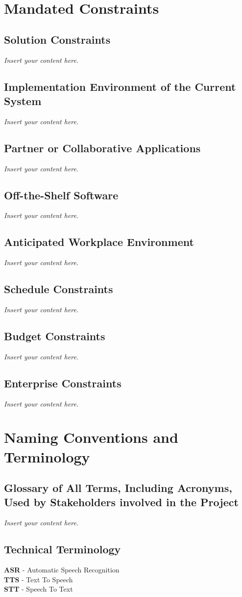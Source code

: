 \documentclass[12pt]{article}
\newcommand{\lips}{\textit{Insert your content here.}}
\begin{document}
\section{Mandated Constraints}
\subsection{Solution Constraints}
\lips
\subsection{Implementation Environment of the Current System}
\lips
\subsection{Partner or Collaborative Applications}
\lips
\subsection{Off-the-Shelf Software}
\lips
\subsection{Anticipated Workplace Environment}
\lips
\subsection{Schedule Constraints}
\lips
\subsection{Budget Constraints}
\lips
\subsection{Enterprise Constraints}
\lips

\section{Naming Conventions and Terminology}
\subsection{Glossary of All Terms, Including Acronyms, Used by Stakeholders
involved in the Project}
\lips

\subsection{Technical Terminology}
\textbf{ASR} - Automatic Speech Recognition \\
\textbf{TTS} - Text To Speech \\
\textbf{STT} - Speech To Text \\
\end{document}
